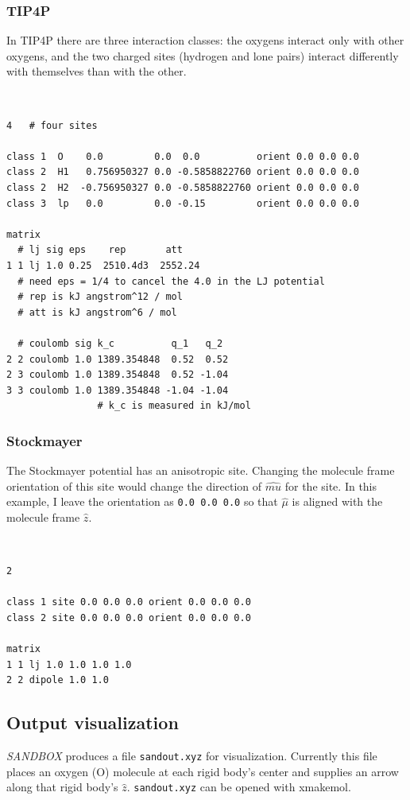 \documentclass[12pt,a4paper,dvips]{article}
\begin{document}
\subsubsection{TIP4P}
In TIP4P there are three interaction classes: the oxygens interact only with other oxygens, and the two charged sites (hydrogen and lone pairs) interact differently with themselves than with the other.
{\tt
\begin{verbatim}
4   # four sites

class 1  O    0.0         0.0  0.0          orient 0.0 0.0 0.0
class 2  H1   0.756950327 0.0 -0.5858822760 orient 0.0 0.0 0.0
class 2  H2  -0.756950327 0.0 -0.5858822760 orient 0.0 0.0 0.0
class 3  lp   0.0         0.0 -0.15         orient 0.0 0.0 0.0

matrix
  # lj sig eps    rep       att
1 1 lj 1.0 0.25  2510.4d3  2552.24
  # need eps = 1/4 to cancel the 4.0 in the LJ potential
  # rep is kJ angstrom^12 / mol
  # att is kJ angstrom^6 / mol

  # coulomb sig k_c          q_1   q_2
2 2 coulomb 1.0 1389.354848  0.52  0.52
2 3 coulomb 1.0 1389.354848  0.52 -1.04
3 3 coulomb 1.0 1389.354848 -1.04 -1.04
                # k_c is measured in kJ/mol
\end{verbatim}
}

\subsubsection{Stockmayer}
The Stockmayer potential has an anisotropic site. Changing the molecule frame orientation of this site would change the direction of $\hat{mu}$ for the site. In this example, I leave the orientation as {\tt 0.0 0.0 0.0} so that $\hat{\mu}$ is aligned with the molecule frame $\hat{z}$. 
{\tt
\begin{verbatim}
2

class 1 site 0.0 0.0 0.0 orient 0.0 0.0 0.0
class 2 site 0.0 0.0 0.0 orient 0.0 0.0 0.0

matrix
1 1 lj 1.0 1.0 1.0 1.0
2 2 dipole 1.0 1.0
\end{verbatim}
}

\subsection{Output visualization}
{\it SANDBOX} produces a file {\tt sandout.xyz} for visualization. Currently this file places an oxygen (O) molecule at each rigid body's center and supplies an arrow along that rigid body's $\hat{z}$. {\tt sandout.xyz} can be opened with xmakemol.
\end{document}
